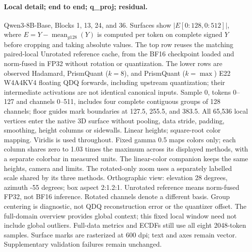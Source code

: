 \paragraph{Local detail; end to end; q\_proj; residual.} Qwen3-8B-Base, Blocks 1, 13, 24, and 36. Surfaces show $|E[0:128,0:512]|$, where $E=Y-\operatorname{mean}_{g128}(Y)$ is computed per token on complete signed $Y$ before cropping and taking absolute values. The top row reuses the matching paired-local Unrotated reference cache, from the BF16 checkpoint loaded and norm-fused in FP32 without rotation or quantization. The lower rows are observed Hadamard, PrismQuant ($k=8$), and PrismQuant ($k=\max$) E22 W4A4KV4 floating QDQ forwards, including upstream quantization; their intermediate activations are not identical canonical inputs. Sample 0, tokens 0--127 and channels 0--511, includes four complete contiguous groups of 128 channels; floor guides mark boundaries at 127.5, 255.5, and 383.5. All 65,536 local vertices enter the native 3D surface without pooling, data stride, padding, smoothing, height columns or sidewalls. Linear heights; square-root color mapping. Viridis is used throughout. Fixed gamma 0.5 maps colors only; each column shares zero to 1.03 times the maximum across its displayed methods, with a separate colorbar in measured units. The linear-color companion keeps the same heights, camera and limits. The rotated-only zoom uses a separately labelled scale shared by its three methods. Orthographic view: elevation 28 degrees, azimuth -55 degrees; box aspect 2:1.2:1. Unrotated reference means norm-fused FP32, not BF16 inference. Rotated channels denote a different basis. Group centering is diagnostic, not QDQ reconstruction error or the quantizer offset. The full-domain overview provides global context; this fixed local window need not include global outliers. Full-data metrics and ECDFs still use all eight 2048-token samples. Surface marks are rasterized at 600 dpi; text and axes remain vector. Supplementary validation failures remain unchanged.

